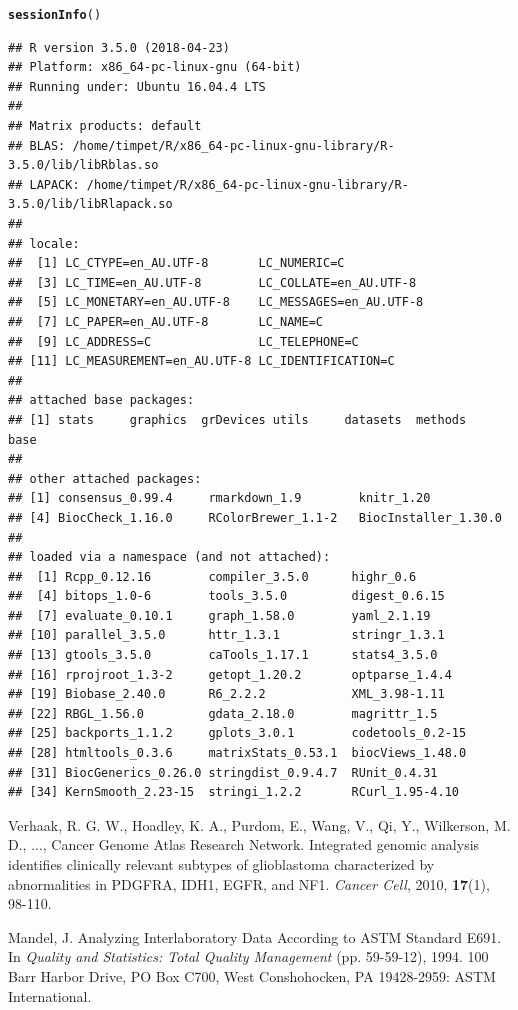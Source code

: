 \documentclass{article}\usepackage[]{graphicx}\usepackage[]{color}
\makeatletter
\newcommand{\hlstd}[1]{\textcolor[rgb]{0.345,0.345,0.345}{#1}}%
\newcommand{\hlkwd}[1]{\textcolor[rgb]{0.737,0.353,0.396}{\textbf{#1}}}%
\newenvironment{kframe}{%
 \def\at@end@of@kframe{}%
 \ifinner\ifhmode%
  \def\at@end@of@kframe{\end{minipage}}%
  \begin{minipage}{\columnwidth}%
 \fi\fi%
 \def\FrameCommand##1{\hskip\@totalleftmargin \hskip-\fboxsep
 \colorbox{shadecolor}{##1}\hskip-\fboxsep
     \hskip-\linewidth \hskip-\@totalleftmargin \hskip\columnwidth}%
 \MakeFramed {\advance\hsize-\width
   \@totalleftmargin\z@ \linewidth\hsize
   \@setminipage}}%
 {\par\unskip\endMakeFramed%
 \at@end@of@kframe}
\newenvironment{knitrout}{}{} %
\makeatother
\begin{document}
\begin{knitrout}
\color{fgcolor}\begin{kframe}
\begin{alltt}
\hlkwd{sessionInfo}\hlstd{()}
\end{alltt}
\begin{verbatim}
## R version 3.5.0 (2018-04-23)
## Platform: x86_64-pc-linux-gnu (64-bit)
## Running under: Ubuntu 16.04.4 LTS
## 
## Matrix products: default
## BLAS: /home/timpet/R/x86_64-pc-linux-gnu-library/R-3.5.0/lib/libRblas.so
## LAPACK: /home/timpet/R/x86_64-pc-linux-gnu-library/R-3.5.0/lib/libRlapack.so
## 
## locale:
##  [1] LC_CTYPE=en_AU.UTF-8       LC_NUMERIC=C              
##  [3] LC_TIME=en_AU.UTF-8        LC_COLLATE=en_AU.UTF-8    
##  [5] LC_MONETARY=en_AU.UTF-8    LC_MESSAGES=en_AU.UTF-8   
##  [7] LC_PAPER=en_AU.UTF-8       LC_NAME=C                 
##  [9] LC_ADDRESS=C               LC_TELEPHONE=C            
## [11] LC_MEASUREMENT=en_AU.UTF-8 LC_IDENTIFICATION=C       
## 
## attached base packages:
## [1] stats     graphics  grDevices utils     datasets  methods   base     
## 
## other attached packages:
## [1] consensus_0.99.4     rmarkdown_1.9        knitr_1.20          
## [4] BiocCheck_1.16.0     RColorBrewer_1.1-2   BiocInstaller_1.30.0
## 
## loaded via a namespace (and not attached):
##  [1] Rcpp_0.12.16        compiler_3.5.0      highr_0.6          
##  [4] bitops_1.0-6        tools_3.5.0         digest_0.6.15      
##  [7] evaluate_0.10.1     graph_1.58.0        yaml_2.1.19        
## [10] parallel_3.5.0      httr_1.3.1          stringr_1.3.1      
## [13] gtools_3.5.0        caTools_1.17.1      stats4_3.5.0       
## [16] rprojroot_1.3-2     getopt_1.20.2       optparse_1.4.4     
## [19] Biobase_2.40.0      R6_2.2.2            XML_3.98-1.11      
## [22] RBGL_1.56.0         gdata_2.18.0        magrittr_1.5       
## [25] backports_1.1.2     gplots_3.0.1        codetools_0.2-15   
## [28] htmltools_0.3.6     matrixStats_0.53.1  biocViews_1.48.0   
## [31] BiocGenerics_0.26.0 stringdist_0.9.4.7  RUnit_0.4.31       
## [34] KernSmooth_2.23-15  stringi_1.2.2       RCurl_1.95-4.10
\end{verbatim}
\end{kframe}
\end{knitrout}

\begin{thebibliography}{9}

  Verhaak, R. G. W., Hoadley, K. A., Purdom, E., Wang, V., Qi, Y., Wilkerson, M. D., ..., Cancer Genome Atlas Research Network. Integrated genomic analysis identifies clinically relevant subtypes of glioblastoma characterized by abnormalities in PDGFRA, IDH1, EGFR, and NF1. \emph{Cancer Cell}, 2010, \textbf{17}(1), 98-110. 
  
Mandel, J. Analyzing Interlaboratory Data According to ASTM Standard E691. In \emph{Quality and Statistics: Total Quality Management} (pp. 59-59-12), 1994. 100 Barr Harbor Drive, PO Box C700, West Conshohocken, PA 19428-2959: ASTM International.

\end{thebibliography}
\end{document}
